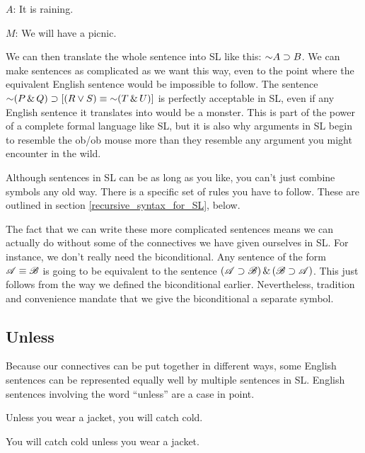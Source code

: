 \begin{ekey}
\item[$A$:] It is raining.
\item[$M$:] We will have a picnic.
\end{ekey}

We can then translate the whole sentence into SL like this: $\mathord{\sim} A \supset B$. We can make sentences as complicated as we want this way, even to the point where the equivalent English sentence would be impossible to follow. The sentence $\mathord{\sim} (P \,\&\, Q) \supset  [(R \vee S) \equiv \mathord{\sim} (T \,\&\, U)]$ is perfectly acceptable in SL, even if any English sentence it translates into would be a monster. This is part of the power of a complete formal language like SL, but it is also why arguments in SL begin to resemble the ob/ob mouse more than they resemble any argument you might encounter in the wild. 

Although sentences in SL can be as long as you like, you can't just combine symbols any old way. There is a specific set of rules you have to follow. These are outlined in section \ref{recursive_syntax_for_SL}, below.

The fact that we can write these more complicated sentences means we can actually do without some of the connectives we have given ourselves in SL. For instance, we don't really need the biconditional. Any sentence of the form $\mathscr{A} \equiv \mathscr{B}$ is going to be equivalent to the sentence $(\mathscr{A} \supset \mathscr{B}) \,\&\, (\mathscr{B} \supset \mathscr{A})$. This just follows from the way we defined the biconditional earlier. Nevertheless, tradition and convenience mandate that we give the biconditional a separate symbol.

\subsection{Unless}

Because our connectives can be put together in different ways, some English sentences can be represented equally well by multiple sentences in SL. English sentences involving the word ``unless'' are a case in point. 

\begin{earg}
\item[\ex{unless1}] Unless you wear a jacket, you will catch cold. 
\item[\ex{unless2}] You will catch cold unless you wear a jacket. 
\end{earg}

